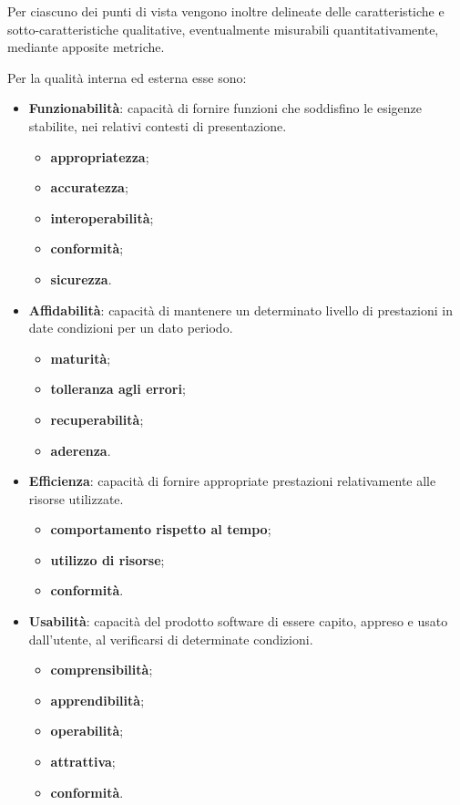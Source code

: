 Per ciascuno dei punti di vista vengono inoltre delineate delle caratteristiche e sotto-caratteristiche qualitative, eventualmente misurabili quantitativamente, mediante apposite metriche.

Per la qualità interna ed esterna esse sono:
\begin{itemize}
\item \textbf{Funzionabilità}: capacità di fornire funzioni che soddisfino le esigenze stabilite, nei relativi contesti di presentazione.
	\begin{itemize}
	\item \textbf{appropriatezza};
	\item \textbf{accuratezza};
	\item \textbf{interoperabilità};
	\item \textbf{conformità};
	\item \textbf{sicurezza}.
	\end{itemize}
\item \textbf{Affidabilità}: capacità di mantenere un determinato livello di prestazioni in date condizioni per un dato periodo.
	\begin{itemize}
	\item \textbf{maturità};
	\item \textbf{tolleranza agli errori};
	\item \textbf{recuperabilità};
	\item \textbf{aderenza}.
	\end{itemize}
\item \textbf{Efficienza}: capacità di fornire appropriate prestazioni relativamente alle risorse utilizzate.
	\begin{itemize}
	\item \textbf{comportamento rispetto al tempo};
	\item \textbf{utilizzo di risorse};
	\item \textbf{conformità}.
	\end{itemize}
\item \textbf{Usabilità}: capacità del prodotto software di essere capito, appreso e usato dall'utente, al verificarsi di determinate condizioni.
	\begin{itemize}
	\item \textbf{comprensibilità};
	\item \textbf{apprendibilità};
	\item \textbf{operabilità};
	\item \textbf{attrattiva};
	\item \textbf{conformità}.

\end{itemize}
\end{itemize}
